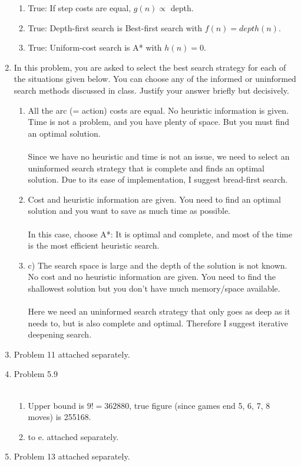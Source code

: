 \documentclass[10pt]{article}
\begin{document}
\begin{enumerate}
  \begin{enumerate}
  \item True: If step costs are equal, $g(n) \propto$ depth.
  \item True: Depth-first search is Best-first search with $f(n) = depth(n)$.
  \item True: Uniform-cost search is A* with $h(n) = 0$.
  \end{enumerate}
\item In this problem, you are asked
  to select the best search strategy for each of the situations given
  below. You can choose any of the informed or uninformed search
  methods discussed in class. Justify your answer briefly but
  decisively.  
  \begin{enumerate}
  \item All the arc (= action) costs are equal. No heuristic
  information is given. Time is not a problem, and you have plenty of
  space. But you must find an optimal solution. \\ \\
  Since we have no heuristic and time is not an issue, we need to select an uninformed search strategy that is complete and finds an optimal solution. Due to its ease of implementation, I suggest bread-first search.
  \item Cost and heuristic
  information are given. You need to find an optimal solution and you
  want to save as much time as possible.  \\ \\
  In this case, choose A*: It is optimal and complete, and most of the time is the most efficient heuristic search.
  \item c) The search space is large
  and the depth of the solution is not known. No cost and no heuristic
  information are given. You need to find the shallowest solution but
  you don't have much memory/space available. \\ \\
  Here we need an uninformed search strategy that only goes as deep as it needs to, but is also complete and optimal. Therefore I suggest iterative deepening search.
  \end{enumerate}

\item Problem 11 attached separately.

\item Problem 5.9 \\ \\
  \begin{enumerate}
  \item Upper bound is $9! = 362880$, true figure (since games end 5, 6, 7, 8 moves) is 255168.
  \item to e. attached separately.
  \end{enumerate}

\item Problem 13 attached separately.

\end{enumerate}
\end{document}
